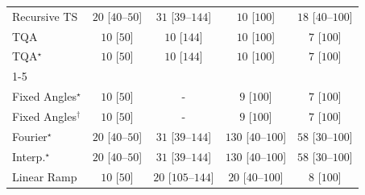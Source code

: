 \begin{tabular}{l|cccc|}
Recursive TS & {\cellcolor[HTML]{F5FBF2}} \color[HTML]{000000} $20$ [$40$--$50$] & {\cellcolor[HTML]{F3FAF0}} \color[HTML]{000000} $31$ [$39$--$144$] & {\cellcolor[HTML]{F7FCF5}} \color[HTML]{000000} $10$ [$100$] & {\cellcolor[HTML]{F5FBF3}} \color[HTML]{000000} $18$ [$40$--$100$] \\
TQA & {\cellcolor[HTML]{F7FCF5}} \color[HTML]{000000} $10$ [$50$] & {\cellcolor[HTML]{F7FCF5}} \color[HTML]{000000} $10$ [$144$] & {\cellcolor[HTML]{F7FCF5}} \color[HTML]{000000} $10$ [$100$] & {\cellcolor[HTML]{F7FCF5}} \color[HTML]{000000} $7$ [$100$] \\
TQA$^\star$ & {\cellcolor[HTML]{F7FCF5}} \color[HTML]{000000} $10$ [$50$] & {\cellcolor[HTML]{F7FCF5}} \color[HTML]{000000} $10$ [$144$] & {\cellcolor[HTML]{F7FCF5}} \color[HTML]{000000} $10$ [$100$] & {\cellcolor[HTML]{F7FCF5}} \color[HTML]{000000} $7$ [$100$] \\
\cline{1-5}
\multicolumn{5}{c}{\rule{0pt}{8pt}PP} \\
\midrule
Fixed Angles$^\star$ & {\cellcolor[HTML]{F7FCF5}} \color[HTML]{000000} $10$ [$50$] & {\cellcolor[HTML]{000000}} \color[HTML]{F1F1F1} {\cellcolor{white}} \color{black} - & {\cellcolor[HTML]{F7FCF5}} \color[HTML]{000000} $9$ [$100$] & {\cellcolor[HTML]{F7FCF5}} \color[HTML]{000000} $7$ [$100$] \\
Fixed Angles$^\dagger$ & {\cellcolor[HTML]{F7FCF5}} \color[HTML]{000000} $10$ [$50$] & {\cellcolor[HTML]{000000}} \color[HTML]{F1F1F1} {\cellcolor{white}} \color{black} - & {\cellcolor[HTML]{F7FCF5}} \color[HTML]{000000} $9$ [$100$] & {\cellcolor[HTML]{F7FCF5}} \color[HTML]{000000} $7$ [$100$] \\
Fourier$^\star$ & {\cellcolor[HTML]{F5FBF2}} \color[HTML]{000000} $20$ [$40$--$50$] & {\cellcolor[HTML]{F3FAF0}} \color[HTML]{000000} $31$ [$39$--$144$] & {\cellcolor[HTML]{DFF3DA}} \color[HTML]{000000} $130$ [$40$--$100$] & {\cellcolor[HTML]{EFF9EB}} \color[HTML]{000000} $58$ [$30$--$100$] \\
Interp.$^\star$ & {\cellcolor[HTML]{F5FBF2}} \color[HTML]{000000} $20$ [$40$--$50$] & {\cellcolor[HTML]{F3FAF0}} \color[HTML]{000000} $31$ [$39$--$144$] & {\cellcolor[HTML]{DFF3DA}} \color[HTML]{000000} $130$ [$40$--$100$] & {\cellcolor[HTML]{EFF9EB}} \color[HTML]{000000} $58$ [$30$--$100$] \\
Linear Ramp & {\cellcolor[HTML]{F7FCF5}} \color[HTML]{000000} $10$ [$50$] & {\cellcolor[HTML]{F5FBF2}} \color[HTML]{000000} $20$ [$105$--$144$] & {\cellcolor[HTML]{F5FBF2}} \color[HTML]{000000} $20$ [$40$--$100$] & {\cellcolor[HTML]{F7FCF5}} \color[HTML]{000000} $8$ [$100$] \\

\end{tabular}
